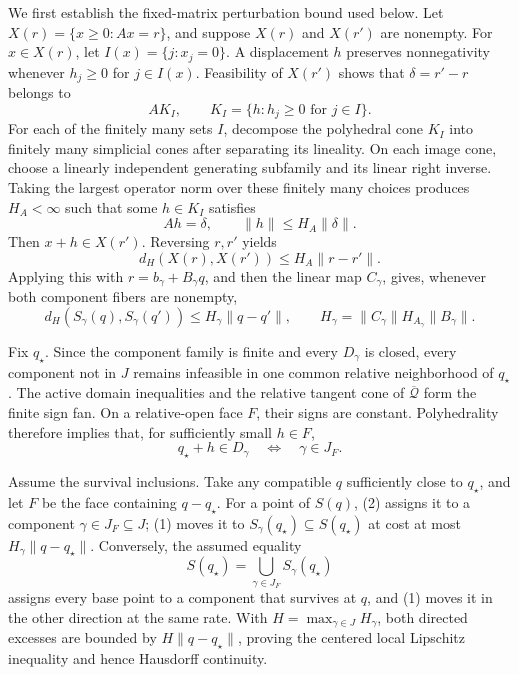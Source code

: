 We first establish the fixed-matrix perturbation bound used below.  Let \(X(r)=\{x\ge0:Ax=r\}\), and suppose \(X(r)\) and \(X(r')\) are nonempty.  For \(x\in X(r)\), let \(I(x)=\{j:x_j=0\}\).  A displacement \(h\) preserves nonnegativity whenever \(h_j\ge0\) for \(j\in I(x)\).  Feasibility of \(X(r')\) shows that \(\delta=r'-r\) belongs to
\[
A K_I,\qquad K_I=\{h:h_j\ge0\text{ for }j\in I\}.
\]
For each of the finitely many sets \(I\), decompose the polyhedral cone \(K_I\) into finitely many simplicial cones after separating its lineality.  On each image cone, choose a linearly independent generating subfamily and its linear right inverse.  Taking the largest operator norm over these finitely many choices produces \(H_A<\infty\) such that some \(h\in K_I\) satisfies
\[
Ah=\delta,\qquad \|h\|\le H_A\|\delta\|.
\]
Then \(x+h\in X(r')\).  Reversing \(r,r'\) yields
\[
d_H(X(r),X(r'))\le H_A\|r-r'\|.
\]
Applying this with \(r=b_\gamma+B_\gamma q\), and then the linear map \(C_\gamma\), gives, whenever both component fibers are nonempty,
\[
d_H(S_\gamma(q),S_\gamma(q'))
\le H_\gamma\|q-q'\|,\qquad
H_\gamma=\|C_\gamma\|H_{A_\gamma}\|B_\gamma\|.
\tag{1}
\]

Fix \(q_\star\).  Since the component family is finite and every \(D_\gamma\) is closed, every component not in \(J\) remains infeasible in one common relative neighborhood of \(q_\star\).  The active domain inequalities and the relative tangent cone of \(\overline{\mathcal Q}\) form the finite sign fan.  On a relative-open face \(F\), their signs are constant.  Polyhedrality therefore implies that, for sufficiently small \(h\in F\),
\[
q_\star+h\in D_\gamma\quad\Longleftrightarrow\quad \gamma\in J_F.
\tag{2}
\]

Assume the survival inclusions.  Take any compatible \(q\) sufficiently close to \(q_\star\), and let \(F\) be the face containing \(q-q_\star\).  For a point of \(S(q)\), (2) assigns it to a component \(\gamma\in J_F\subseteq J\); (1) moves it to \(S_\gamma(q_\star)\subseteq S(q_\star)\) at cost at most \(H_\gamma\|q-q_\star\|\).  Conversely, the assumed equality
\[
S(q_\star)=\bigcup_{\gamma\in J_F}S_\gamma(q_\star)
\]
assigns every base point to a component that survives at \(q\), and (1) moves it in the other direction at the same rate.  With \(H=\max_{\gamma\in J}H_\gamma\), both directed excesses are bounded by \(H\|q-q_\star\|\), proving the centered local Lipschitz inequality and hence Hausdorff continuity.

